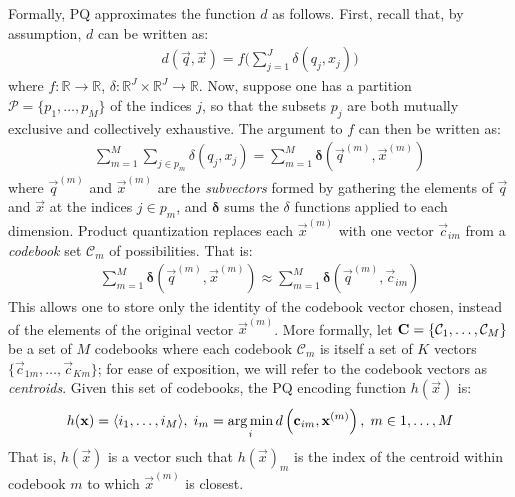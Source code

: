 Formally, PQ approximates the function $d$ as follows. First, recall that, by assumption, $d$ can be written as:
\begin{align*}
        d(\vec{q}, \vec{x}) = f \big( \sum_{j=1}^J \delta(q_j, x_j) \big)
\end{align*}
where $f: \mathbb{R} \rightarrow \mathbb{R}$, $\delta: \mathbb{R}^J \times \mathbb{R}^J \rightarrow \mathbb{R}$. Now, suppose one has a partition $\mathcal{P} = \{p_1,\ldots,p_M \}$ of the indices $j$, so that the subsets $p_j$ are both mutually exclusive and collectively exhaustive. %
The argument to $f$ can then be written as:
\begin{align}
        \sum_{m=1}^M \sum_{j \in p_m} \delta(q_j, x_j)
            = \sum_{m=1}^M \boldsymbol{\delta} \left( \vec{q}^{(m)}, \vec{x}^{(m)} \right)
\end{align}
where $\vec{q}^{(m)}$ and $\vec{x}^{(m)}$ are the \textit{subvectors} formed by gathering the elements of $\vec{q}$ and $\vec{x}$ at the indices $j \in p_m$, and $\boldsymbol{\delta}$ sums the $\delta$ functions applied to each dimension. Product quantization replaces each $\vec{x}^{(m)}$ with one vector $\vec{c}_{im}$ from a \textit{codebook} set $\mathcal{C}_m$ of possibilities. That is: %
\begin{align} \label{eq:pqDistNoLut}
        \sum_{m=1}^M \boldsymbol{\delta} \left( \vec{q}^{(m)}, \vec{x}^{(m)} \right) \approx \sum_{m=1}^M \boldsymbol{\delta} \left( \vec{q}^{(m)}, \vec{c}_{im} \right)
\end{align}
This allows one to store only the identity of the codebook vector chosen, instead of the elements of the original vector $\vec{x}^{(m)}$. More formally, let $\mathcal{\mathbf{C}} = \{\mathcal{C}_1,\ldots,\mathcal{C}_M\}$ be a set of $M$ codebooks where each codebook $\mathcal{C}_m $ is itself a set of $K$ vectors $\{\vec{c}_{1m},\ldots,\vec{c}_{Km}\}$; for ease of exposition, we will refer to the codebook vectors as \textit{centroids}. Given this set of codebooks, the PQ encoding function $h(\vec{x})$ is:
\begin{align}
    h(\mathbf{x}) = \langle i_1,\ldots,i_M \rangle, \hspace{1mm} i_m = \operatorname*{arg\,min}_i d \left( \mathbf{c}_{im}, \mathbf{x}^{(m)} \right), \hspace{1mm} m \in {1,\ldots,M}
\end{align}
That is, $h(\vec{x})$ is a vector such that $h(\vec{x})_m$ is the index of the centroid within codebook $m$ to which $\vec{x}^{(m)}$ is closest.

